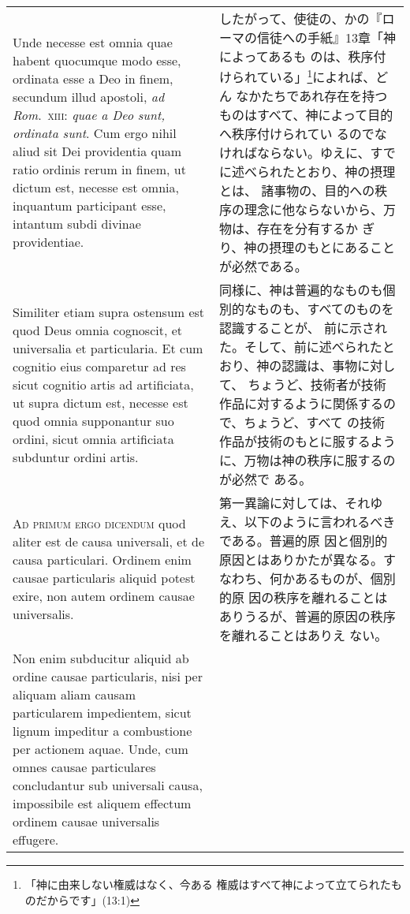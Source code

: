 \documentclass[10pt]{jsarticle} %
\begin{document}
\begin{longtable}{p{21em}p{21em}}
\\

 Unde
necesse est omnia quae habent quocumque modo esse, ordinata esse a Deo
in finem, secundum illud apostoli, {\itshape ad Rom}.~{\scshape xiii}: {\itshape quae a Deo sunt,
ordinata sunt}. Cum ergo nihil aliud sit Dei providentia quam ratio
ordinis rerum in finem, ut dictum est, necesse est omnia, inquantum
participant esse, intantum subdi divinae providentiae. 

&

したがって、使徒の、かの『ローマの信徒への手紙』13章「神によってあるも
のは、秩序付けられている」\footnote{「神に由来しない権威はなく、今ある
権威はすべて神によって立てられたものだからです」(13:1)}によれば、どん
なかたちであれ存在を持つものはすべて、神によって目的へ秩序付けられてい
るのでなければならない。ゆえに、すでに述べられたとおり、神の摂理とは、
諸事物の、目的への秩序の理念に他ならないから、万物は、存在を分有するか
ぎり、神の摂理のもとにあることが必然である。


\\


Similiter etiam
supra ostensum est quod Deus omnia cognoscit, et universalia et
particularia. Et cum cognitio eius comparetur ad res sicut cognitio
artis ad artificiata, ut supra dictum est, necesse est quod omnia
supponantur suo ordini, sicut omnia artificiata subduntur ordini artis.

&

同様に、神は普遍的なものも個別的なものも、すべてのものを認識することが、
前に示された。そして、前に述べられたとおり、神の認識は、事物に対して、
ちょうど、技術者が技術作品に対するように関係するので、ちょうど、すべて
の技術作品が技術のもとに服するように、万物は神の秩序に服するのが必然で
ある。

\\


{\scshape Ad primum ergo dicendum} quod aliter est de
causa universali, et de causa particulari. Ordinem enim causae
particularis aliquid potest exire, non autem ordinem causae
universalis. 

&

第一異論に対しては、それゆえ、以下のように言われるべきである。普遍的原
因と個別的原因とはありかたが異なる。すなわち、何かあるものが、個別的原
因の秩序を離れることはありうるが、普遍的原因の秩序を離れることはありえ
ない。

\\


Non enim subducitur aliquid ab ordine causae particularis,
nisi per aliquam aliam causam particularem impedientem, sicut lignum
impeditur a combustione per actionem aquae. Unde, cum omnes causae
particulares concludantur sub universali causa, impossibile est aliquem
effectum ordinem causae universalis effugere. 



\end{longtable}
\end{document}
